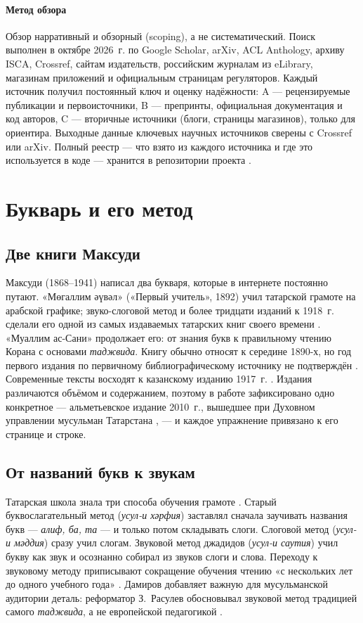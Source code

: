 \documentclass[a4paper,14pt]{extarticle}
\begin{document}
\paragraph{Метод обзора} Обзор нарративный и обзорный (scoping), а не систематический. Поиск выполнен
в октябре 2026~г. по Google Scholar, arXiv, ACL Anthology, архиву ISCA, Crossref, сайтам издательств,
российским журналам из eLibrary, магазинам приложений и официальным страницам регуляторов. Каждый
источник получил постоянный ключ и оценку надёжности: A --- рецензируемые публикации и первоисточники,
B --- препринты, официальная документация и код авторов, C --- вторичные источники (блоги, страницы
магазинов), только для ориентира. Выходные данные ключевых научных источников сверены с Crossref или
arXiv. Полный реестр --- что взято из каждого источника и где это используется в коде --- хранится в
репозитории проекта \cite{SRC-038}.

\section{Букварь и его метод}

\subsection{Две книги Максуди}

Максуди (1868--1941) написал два букваря, которые в интернете постоянно путают. «Мөгаллим әүвәл»
(«Первый учитель», 1892) учил татарской грамоте на арабской графике; звуко-слоговой метод и более
тридцати изданий к 1918~г. сделали его одной из самых издаваемых татарских книг своего времени
\cite{SRC-015,SRC-019}. «Муаллим ас-Сани» продолжает его: от знания букв к правильному чтению Корана с
основами \emph{таджвида}. Книгу обычно относят к середине 1890-х, но год первого издания по первичному
библиографическому источнику не подтверждён \cite{SRC-018}. Современные тексты восходят к казанскому
изданию 1917~г. \cite{SRC-024}. Издания различаются объёмом и содержанием, поэтому в работе
зафиксировано одно конкретное --- альметьевское издание 2010~г., вышедшее при Духовном управлении
мусульман Татарстана \cite{SRC-040}, --- и каждое упражнение привязано к его странице и строке.

\subsection{От названий букв к звукам}

Татарская школа знала три способа обучения грамоте \cite{SRC-017}. Старый буквослагательный метод
(\emph{усул-и хәрфия}) заставлял сначала заучивать названия букв --- \emph{алиф, ба, та} --- и только
потом складывать слоги. Слоговой метод (\emph{усул-и мәддия}) сразу учил слогам. Звуковой метод
джадидов (\emph{усул-и саутия}) учил букву как звук и осознанно собирал из звуков слоги и слова.
Переходу к звуковому методу приписывают сокращение обучения чтению «с нескольких лет до одного
учебного года» \cite{SRC-016}. Дамиров добавляет важную для мусульманской аудитории деталь:
реформатор З.~Расулев обосновывал звуковой метод традицией самого \emph{таджвида}, а не европейской
педагогикой \cite{SRC-016}.
\end{document}
